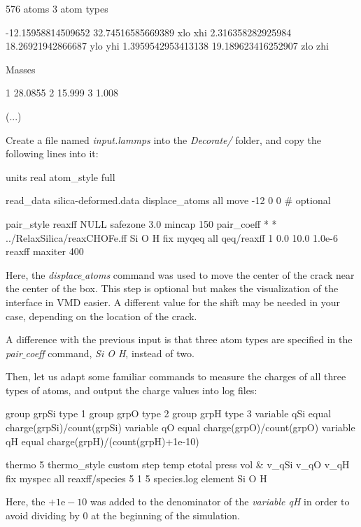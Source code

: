 \begin{lcverbatim}
576 atoms
3 atom types

-12.15958814509652 32.74516585669389 xlo xhi
2.316358282925984 18.26921942866687 ylo yhi
1.3959542953413138 19.189623416252907 zlo zhi

Masses

1 28.0855
2 15.999
3 1.008

(...)
\end{lcverbatim}

\noindent Create a file named \textit{input.lammps} 
into the \textit{Decorate/} folder, and copy
the following lines into it:

\begin{lcverbatim}
units real
atom_style full

read_data silica-deformed.data
displace_atoms all move -12 0 0 # optional

pair_style reaxff NULL safezone 3.0 mincap 150
pair_coeff * * ../RelaxSilica/reaxCHOFe.ff Si O H
fix myqeq all qeq/reaxff 1 0.0 10.0 1.0e-6 reaxff maxiter 400
\end{lcverbatim}

\noindent Here, the \textit{displace$\_$atoms} command was used to move the center of the crack
near the center of the box. This step is optional but makes the visualization
of the interface in VMD easier. A different value for the shift may be
needed in your case, depending on the location of the crack.

\vspace{0.25cm} \noindent A difference with the previous input is that three atom types are specified
in the \textit{pair$\_$coeff} command, \textit{Si O H}, instead of two.

\vspace{0.25cm} \noindent Then, let us adapt some familiar commands to measure the charges of all
three types of atoms, and output the charge values into log files:

\begin{lcverbatim}
group grpSi type 1
group grpO type 2
group grpH type 3
variable qSi equal charge(grpSi)/count(grpSi)
variable qO equal charge(grpO)/count(grpO)
variable qH equal charge(grpH)/(count(grpH)+1e-10)

thermo 5
thermo_style custom step temp etotal press vol &
    v_qSi v_qO v_qH
fix myspec all reaxff/species 5 1 5 species.log element Si O H
\end{lcverbatim}

\noindent Here, the $+1\text{e}-10$ was added to the denominator of the
\textit{variable qH} in order to avoid dividing by 0 at the beginning of the
simulation.

